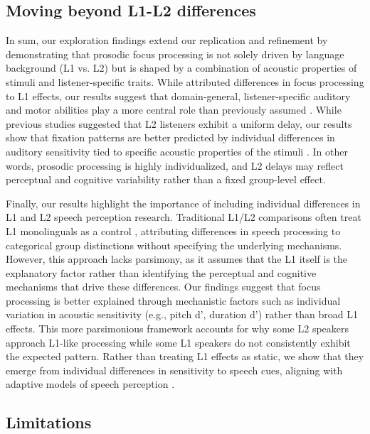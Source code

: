\subsection{Moving beyond L1-L2 differences}

In sum, our exploration findings extend our replication and refinement by demonstrating that prosodic focus processing is not solely driven by language background (L1 vs. L2) but is shaped by a combination of acoustic properties of stimuli and listener-specific traits. While \cite{ge2021a} attributed differences in focus processing to L1 effects, our results suggest that domain-general, listener-specific auditory and motor abilities play a more central role than previously assumed \parencite{saito2022does, bramlett_wiener_24_speechprosody, bakkouche2025effects, Kachlicka_Saito_Tierney_2019}. While previous studies suggested that L2 listeners exhibit a uniform delay, our results show that fixation patterns are better predicted by individual differences in auditory sensitivity tied to specific acoustic properties of the stimuli \parencite{xie2023adaptive}. In other words, prosodic processing is highly individualized, and L2 delays may reflect perceptual and cognitive variability rather than a fixed group-level effect. 

Finally, our results highlight the importance of including individual differences in L1 and L2 speech perception research. Traditional L1/L2 comparisons often treat L1 monolinguals as a control \parencite{rothman2023monolingual}, attributing differences in speech processing to categorical group distinctions without specifying the underlying mechanisms. However, this approach lacks parsimony, as it assumes that the L1 itself is the explanatory factor rather than identifying the perceptual and cognitive mechanisms that drive these differences. Our findings suggest that focus processing is better explained through mechanistic factors such as individual variation in acoustic sensitivity (e.g., pitch d$’$, duration d$’$) rather than broad L1 effects. This more parsimonious framework accounts for why some L2 speakers approach L1-like processing while some L1 speakers do not consistently exhibit the expected pattern. Rather than treating L1 effects as static, we show that they emerge from individual differences in sensitivity to speech cues, aligning with adaptive models of speech perception \parencite{xie2023adaptive}. 


\subsection{Limitations}

